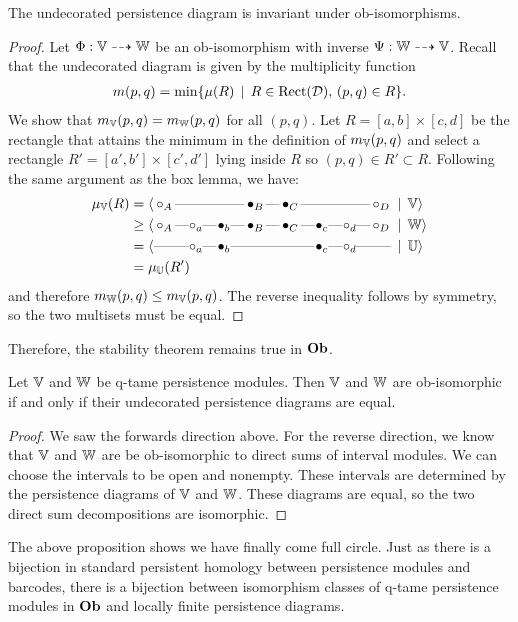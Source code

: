 \begin{proposition}
The undecorated persistence diagram is invariant under ob-isomorphisms.
\end{proposition}
\begin{proof}
Let $\Phi : \mathbb{V} \dashrightarrow \mathbb{W}$ be an ob-isomorphism with inverse $\Psi : \mathbb{W} \dashrightarrow \mathbb{V}$. Recall that the undecorated diagram is given by the multiplicity function
\begin{align*}
m(p, q) = \min \{ \mu(R) \, \mid \, R \in \operatorname{Rect}(\mathcal{D}), \, (p, q) \in R \}.
\end{align*}
We show that $m_{\mathbb{V}}(p, q) = m_{\mathbb{W}}(p, q)$ for all $(p, q)$. Let $R = [a, b] \times [c, d]$ be the rectangle that attains the minimum in the definition of $m_{\mathbb{V}}(p, q)$ and select a rectangle $R' = [a', b'] \times [c', d']$ lying inside $R$ so $(p, q) \in R' \subset R$. Following the same argument as the box lemma, we have:
\begin{align*}
\mu_\V(R) &= \langle \Qoff{A} \qem \qno \qem \qno \qem \Qon{B} \qem \Qon{C} \qem \qno \qem \qno \qem \Qoff{D} \st \V \rangle \\
&\geq \langle \Qoff{A} \qem \qoff{a} \qem \qon{b} \qem \Qon{B} \qem \Qon{C} \qem \qon{c} \qem \qoff{d} \qem \Qoff{D} \st \W \rangle \\
&= \langle \Qno \qem \qoff{a} \qem \qon{b} \qem \Qno \qem \Qno \qem \qon{c} \qem \qoff{d} \qem \Qno \st \U \rangle \\
&= \mu_\U(R')
\end{align*}
and therefore $m_{\mathbb{W}}(p, q) \leq m_{\mathbb{V}}(p, q)$. The reverse inequality follows by symmetry, so the two multisets must be equal.
\end{proof}

Therefore, the stability theorem remains true in $\mathbf{Ob}$. 

\begin{proposition}
Let $\mathbb{V}$ and $\mathbb{W}$ be q-tame persistence modules. Then $\mathbb{V}$ and $\mathbb{W}$ are ob-isomorphic if and only if their undecorated persistence diagrams are equal.
\end{proposition}
\begin{proof}
We saw the forwards direction above. For the reverse direction, we know that $\mathbb{V}$ and $\mathbb{W}$ are be ob-isomorphic to direct sums of interval modules. We can choose the intervals to be open and nonempty. These intervals are determined by the persistence diagrams of $\mathbb{V}$ and $\mathbb{W}$. These diagrams are equal, so the two direct sum decompositions are isomorphic. 
\end{proof}

The above proposition shows we have finally come full circle. Just as there is a bijection in standard persistent homology between persistence modules and barcodes, there is a bijection between isomorphism classes of q-tame persistence modules in $\mathbf{Ob}$ and locally finite persistence diagrams.